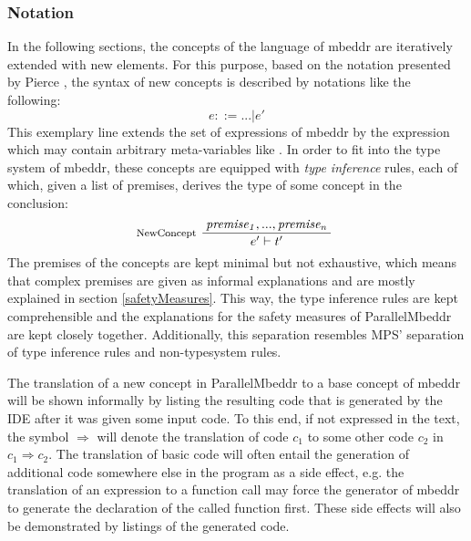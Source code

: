 \subsubsection{Notation}
In the following sections, the concepts of the language of mbeddr are iteratively extended with new elements. For this purpose, based on the notation presented by Pierce \cite{TypesAndProgrammingLanguages}, the syntax of new concepts is described by notations like the following:
\begin{equation}
e ::= ...| e'
\end{equation}
This exemplary line extends the set of expressions of mbeddr by the expression  which may contain arbitrary meta-variables like . In order to fit into the type system of mbeddr, these concepts are equipped with \textit{type inference} rules, each of which, given a list of premises, derives the type of some concept in the conclusion:
\begin{equation}
\inference*[NewConcept]{\mathit{premise_1}, ..., \mathit{premise_n}}{\qquad\quad e' |- t' \qquad\quad} 
\end{equation}
The premises of the concepts are kept minimal but not exhaustive, which means that complex premises are given as informal explanations and are mostly explained in section \ref{safetyMeasures}. This way, the type inference rules are kept comprehensible and the explanations for the safety measures of ParallelMbeddr are kept closely together. Additionally, this separation resembles MPS' separation of type inference rules and non-typesystem rules.

The translation of a new concept in ParallelMbeddr to a base concept of mbeddr will be shown informally by listing the resulting code that is generated by the IDE after it was given some input code. To this end, if not expressed in the text, the symbol $\Longrightarrow$ will denote the translation of code $c_1$ to some other code $c_2$ in $c_1 \Longrightarrow c_2$. The translation of basic code will often entail the generation of additional code somewhere else in the program as a side effect, e.g. the translation of an expression to a function call may force the generator of mbeddr to generate the declaration of the called function first. These side effects will also be demonstrated by listings of the generated code.